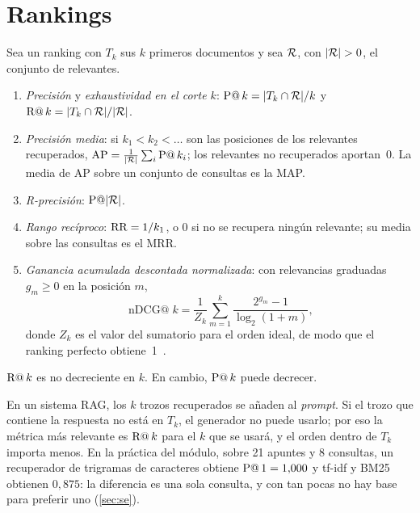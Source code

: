 \section{Rankings}

\begin{definicion}\label{def:metricas-ranking}
Sea un ranking con $T_k$ sus $k$ primeros documentos y sea $\mathcal{R}$, con $\lvert\mathcal{R}\rvert>0$, el conjunto de relevantes.
\begin{enumerate}
  \item \emph{Precisión} y \emph{exhaustividad en el corte $k$}: $\operatorname{P@}k=\lvert T_k\cap\mathcal{R}\rvert/k$ y $\operatorname{R@}k=\lvert T_k\cap\mathcal{R}\rvert/\lvert\mathcal{R}\rvert$.
  \item \emph{Precisión media}: si $k_1<k_2<\dots$ son las posiciones de los relevantes recuperados, $\operatorname{AP}=\frac{1}{\lvert\mathcal{R}\rvert}\sum_i\operatorname{P@}k_i$; los relevantes no recuperados aportan~0. La media de AP sobre un conjunto de consultas es la MAP.
  \item \emph{R-precisión}: $\operatorname{P@}\lvert\mathcal{R}\rvert$.
  \item \emph{Rango recíproco}: $\operatorname{RR}=1/k_1$, o $0$ si no se recupera ningún relevante; su media sobre las consultas es el MRR.
  \item \emph{Ganancia acumulada descontada normalizada}: con relevancias graduadas $g_m\ge 0$ en la posición $m$,
  \[
  \operatorname{nDCG@}k=\frac{1}{Z_k}\sum_{m=1}^{k}\frac{2^{g_m}-1}{\log_2(1+m)},
  \]
  donde $Z_k$ es el valor del sumatorio para el orden ideal, de modo que el ranking perfecto obtiene~1~\cite[§8.4]{iir}.
\end{enumerate}
\end{definicion}

\begin{proposicion}[Monotonía]\label{prop:monotonia}
$\operatorname{R@}k$ es no decreciente en $k$. En cambio, $\operatorname{P@}k$ puede decrecer.
\end{proposicion}

\addtocounter{definicion}{1}%

\addtocounter{definicion}{1}%

\begin{observacion}\label{obs:recall-rag}
En un sistema RAG, los $k$ trozos recuperados se añaden al \emph{prompt}. Si el trozo que contiene la respuesta no está en $T_k$, el generador no puede usarlo; por eso la métrica más relevante es $\operatorname{R@}k$ para el $k$ que se usará, y el orden dentro de $T_k$ importa menos. En la práctica del módulo, sobre 21 apuntes y 8 consultas, un recuperador de trigramas de caracteres obtiene $\operatorname{P@}1=1{,}000$ y tf-idf y BM25 obtienen $0{,}875$: la diferencia es una sola consulta, y con tan pocas no hay base para preferir uno (\cref{sec:se}).
\end{observacion}

